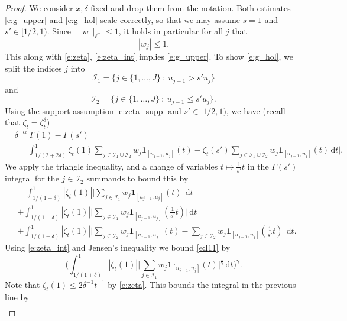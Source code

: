 \documentclass[10pt,a4paper]{amsart}
\begin{document}
    \begin{proof}
    We consider $x, \delta$ fixed and drop them from the notation. Both estimates \eqref{e:g_upper} and \eqref{e:g_hol} scale correctly, so that we may assume $s = 1$ and $s' \in [1/2, 1)$. Since $\|w\|_{\ell^{r'}} \le 1$,
    it holds in particular for all $j$ that
    \[  
        |w_j| \le 1.
    \]
    This along with \eqref{e:zeta}, \eqref{e:zeta_int} implies \eqref{e:g_upper}. To show \eqref{e:g_hol}, we split the indices $j$ into
    \[
        \mathcal{I}_1 = \{j \in \{1, \dotsc, J\} \ : \ u_{j-1} > s' u_{j}\}
    \]
    and 
    \[
        \mathcal{I}_2 = \{j \in \{1, \dotsc, J\} \ : \ u_{j-1}  \le s' u_{j}\}.
    \]
    Using the support assumption \eqref{e:zeta_supp} and $s' \in [1/2,1)$, we have (recall that $\zeta_t = \zeta_t^\delta$)
    \begin{align*}
        &\delta^{-\alpha}|\Gamma(1) - \Gamma(s')|\\
        &= \Big| \int_{1/(2+2\delta)}^{1} \zeta_t(1) \sum_{j \in \mathcal{I}_1 \cup \mathcal{I}_2} w_j \mathbf{1}_{[u_{j-1}, u_j]}(t) - \zeta_t(s') \sum_{j \in \mathcal{I}_1 \cup \mathcal{I}_2} w_j \mathbf{1}_{[u_{j-1}, u_j]}(t)\, \mathrm{d}t \Big|.
    \end{align*}
    We apply the triangle inequality, and a change of variables $t \mapsto \frac{1}{s'}t $ in the $\Gamma(s')$ integral for the $j \in \mathcal{I}_2$ summands to bound this by
    \begin{align}
        &\quad \int_{1/(1+\delta)}^{1} |\zeta_t(1)| \Big|\sum_{j \in \mathcal{I}_1} w_j \mathbf{1}_{[u_{j-1}, u_j]}(t)\Big| \, \mathrm{d}t\label{e:I11}\\
        &+\int_{1/(1+\delta)}^{1} |\zeta_t(1)| \Big|\sum_{j \in \mathcal{I}_1} w_j \mathbf{1}_{[u_{j-1}, u_j]}(\frac{1}{s'}t)\Big| \, \mathrm{d}t\label{e:I12}\\
        &+ \int_{1/(1+\delta)}^{1} |\zeta_t(1)| \Big|\sum_{j \in \mathcal{I}_2} w_j \mathbf{1}_{[u_{j-1}, u_j]}(t) -  \sum_{j \in \mathcal{I}_2} w_j \mathbf{1}_{[u_{j-1}, u_j]}(\frac{1}{s'}t )\Big|\, \mathrm{d}t \label{e:I2}.
    \end{align}
    Using \eqref{e:zeta_int} and Jensen's inequality we bound \eqref{e:I11} by 
    \[
        \Big(\int_{1/(1+\delta)}^1 |\zeta_t(1)| \Big|\sum_{j \in \mathcal{I}_1} w_j \mathbf{1}_{[u_{j-1}, u_j]}(t)\Big|^{\frac{1}{\gamma}} \, \mathrm{d}t \Big)^\gamma.
    \]
    Note that $\zeta_t(1) \le 2 \delta^{-1} t^{-1}$ by \eqref{e:zeta}. This bounds the integral in the previous line by 
    \begin{align*}

\end{align*}
\end{proof}
\end{document}
